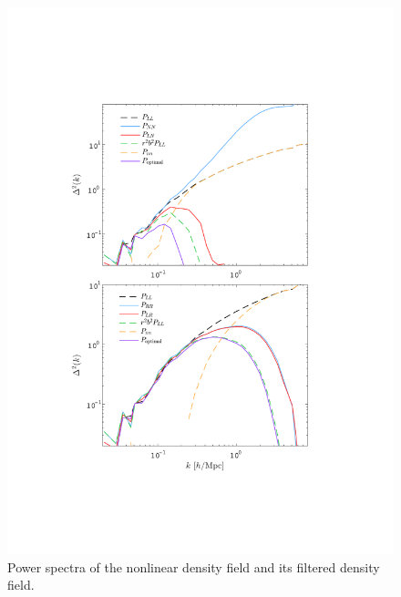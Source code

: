 \documentclass[aps,prd,twocolumn,superscriptaddress,amsfont,amssymb,amsmath,nofootinbib,showpacs,balancelastpage]{revtex4-1}
\begin{document}
\begin{figure}[t] \centering
  \includegraphics[width=1.0\linewidth]{recopower.pdf}
  \caption{Power spectra of the nonlinear density field and its
  filtered density field.}
  \label{fig.recopower}
\end{figure}
\end{document}
